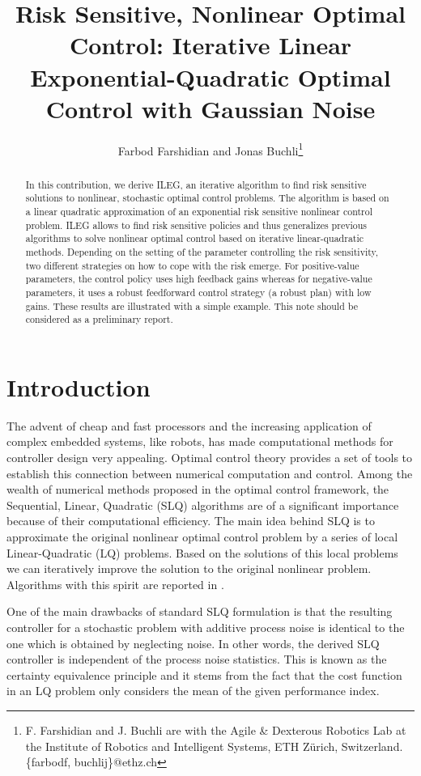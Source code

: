 \documentclass[letterpaper, 10 pt, conference]{ieeeconf}
\title{\LARGE \bf
Risk Sensitive, Nonlinear Optimal Control: Iterative Linear Exponential-Quadratic Optimal Control with Gaussian Noise }
\author{Farbod Farshidian and Jonas Buchli\thanks{F. Farshidian and J. Buchli are with the
Agile \& Dexterous Robotics Lab at the Institute of Robotics and Intelligent
Systems, ETH Z\"urich, Switzerland. \{farbodf, buchlij\}@ethz.ch}}
\begin{document}
\maketitle
\thispagestyle{empty}
\pagestyle{empty}


\begin{abstract}

  In this contribution, we derive ILEG, an iterative algorithm to find risk
  sensitive solutions to nonlinear, stochastic optimal control problems. The
  algorithm is based on a linear quadratic approximation of an exponential risk
  sensitive nonlinear control problem. ILEG allows to find risk sensitive
  policies and thus generalizes previous algorithms to solve nonlinear optimal
  control based on iterative linear-quadratic methods. Depending on the setting
  of the parameter controlling the risk sensitivity, two different strategies on
  how to cope with the risk emerge. For positive-value parameters, the control
  policy uses high feedback gains whereas for negative-value parameters, it uses a
  robust feedforward control strategy (a robust plan) with low gains. These
  results are illustrated with a simple example.  This note should be considered
  as a preliminary report.

\end{abstract}

\section{Introduction}
The advent of cheap and fast processors and the increasing application of 
complex embedded systems, like robots, has made computational methods for
controller design very appealing. Optimal control theory provides a set of
tools to establish this connection between numerical computation and
control. Among the wealth of numerical methods proposed in the optimal
control framework, the Sequential, Linear, Quadratic (SLQ) algorithms are of a
significant importance because of their computational efficiency. The main idea
behind SLQ is to approximate the original nonlinear optimal control problem by a
series of local Linear-Quadratic (LQ) problems. Based on the solutions
of this local problems we
can iteratively improve the solution to the original nonlinear problem.
Algorithms with this spirit are reported in \cite{mayne66, dunn89, sideris05,todorov05}.

One of the main drawbacks of standard SLQ formulation is that the resulting controller for a
stochastic problem with additive process noise is identical to the one which
is obtained by neglecting noise. In other words, the derived SLQ controller is
independent of the process noise statistics. This is known as the certainty
equivalence principle and it stems from the fact that the cost function
in an LQ problem only considers the mean of the given performance index.
\end{document}
